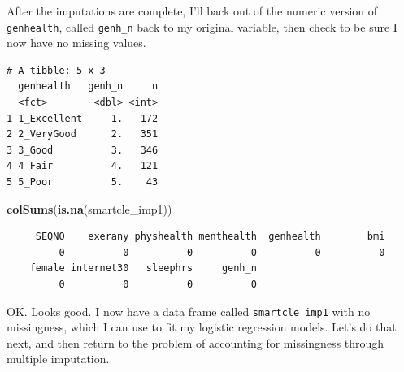 \documentclass[]{book}
\newenvironment{Shaded}{\begin{snugshade}}{\end{snugshade}}
\newcommand{\KeywordTok}[1]{\textcolor[rgb]{0.13,0.29,0.53}{\textbf{#1}}}
\newcommand{\DataTypeTok}[1]{\textcolor[rgb]{0.13,0.29,0.53}{#1}}
\newcommand{\StringTok}[1]{\textcolor[rgb]{0.31,0.60,0.02}{#1}}
\newcommand{\OperatorTok}[1]{\textcolor[rgb]{0.81,0.36,0.00}{\textbf{#1}}}
\newcommand{\NormalTok}[1]{#1}
\theoremstyle{definition}
\theoremstyle{definition}
\theoremstyle{definition}
\theoremstyle{remark}
\begin{document}
After the imputations are complete, I'll back out of the numeric version
of \texttt{genhealth}, called \texttt{genh\_n} back to my original
variable, then check to be sure I now have no missing values.

\begin{Shaded}
\end{Shaded}

\begin{verbatim}
# A tibble: 5 x 3
  genhealth   genh_n     n
  <fct>        <dbl> <int>
1 1_Excellent     1.   172
2 2_VeryGood      2.   351
3 3_Good          3.   346
4 4_Fair          4.   121
5 5_Poor          5.    43
\end{verbatim}

\begin{Shaded}
\begin{Highlighting}[]
\KeywordTok{colSums}\NormalTok{(}\KeywordTok{is.na}\NormalTok{(smartcle_imp1))}
\end{Highlighting}
\end{Shaded}

\begin{verbatim}
     SEQNO    exerany physhealth menthealth  genhealth        bmi 
         0          0          0          0          0          0 
    female internet30   sleephrs     genh_n 
         0          0          0          0 
\end{verbatim}

OK. Looks good. I now have a data frame called \texttt{smartcle\_imp1}
with no missingness, which I can use to fit my logistic regression
models. Let's do that next, and then return to the problem of accounting
for missingness through multiple imputation.
\end{document}
